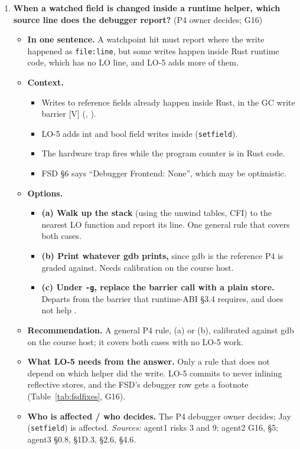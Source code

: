 \documentclass[10pt]{article}
\newcommand{\code}[1]{\texttt{\small #1}}
\newcommand{\mV}{\textsf{\scriptsize[V]}}
\newcommand{\field}[1]{\textbf{#1}\enspace}
\newcommand{\decitem}[1]{\needspace{6\baselineskip}\setcounter{enumi}{\numexpr#1-1\relax}\item}
\begin{document}
\begin{enumerate}[label=\textbf{\arabic*.},ref=\arabic*,leftmargin=1.8em,itemsep=0.8em]
\decitem{15}\label{dec:watch}\textbf{When a watched field is changed inside a runtime helper, which source line does the debugger report?} (P4 owner decides; G16)
\begin{itemize}
\item[] \field{In one sentence.} A watchpoint hit must report where the write happened as \code{file:line}, but some writes happen inside Rust runtime code, which has no LO line, and LO-5 adds more of them.
\item[] \field{Context.}
\begin{itemize}
\item Writes to reference fields already happen inside Rust, in the GC write barrier  \mV{} (, ).
\item LO-5 adds int and bool field writes inside  (\code{setfield}).
\item The hardware trap fires while the program counter is in Rust code.
\item FSD §6 says ``Debugger Frontend: None'', which may be optimistic.
\end{itemize}
\item[] \field{Options.}
\begin{itemize}
\item \textbf{(a) Walk up the stack} (using the unwind tables, CFI) to the nearest LO function and report its line. One general rule that covers both cases.
\item \textbf{(b) Print whatever gdb prints,} since gdb is the reference P4 is graded against. Needs calibration on the course host.
\item \textbf{(c) Under \code{-g}, replace the barrier call with a plain store.} Departs from the barrier that runtime-ABI §3.4 requires, and does not help .
\end{itemize}
\item[] \field{Recommendation.} A general P4 rule, (a) or (b), calibrated against gdb on the course host; it covers both cases with no LO-5 work.
\item[] \field{What LO-5 needs from the answer.} Only a rule that does not depend on which helper did the write. LO-5 commits to never inlining reflective stores, and the FSD's debugger row gets a footnote (Table~\ref{tab:fsdfixes}, G16).
\item[] \field{Who is affected / who decides.} The P4 debugger owner decides; Jay (\code{setfield}) is affected. \emph{Sources:} agent1 risks 3 and 9; agent2 G16, §5; agent3 §0.8, §1D.3, §2.6, §4.6.
\end{itemize}


\end{enumerate}
\end{document}
